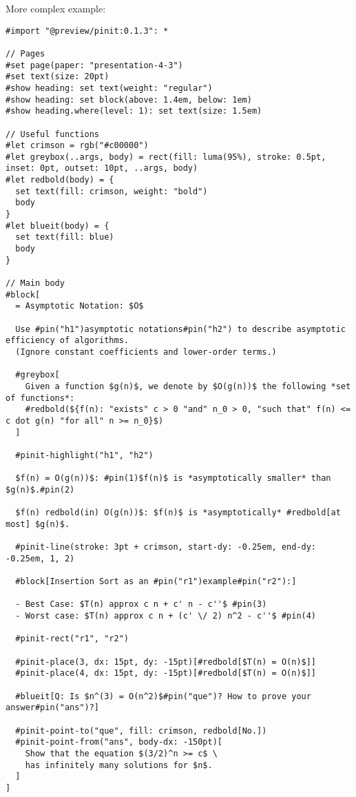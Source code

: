 \pandocbounded{}

More complex example:

\begin{verbatim}
#import "@preview/pinit:0.1.3": *

// Pages
#set page(paper: "presentation-4-3")
#set text(size: 20pt)
#show heading: set text(weight: "regular")
#show heading: set block(above: 1.4em, below: 1em)
#show heading.where(level: 1): set text(size: 1.5em)

// Useful functions
#let crimson = rgb("#c00000")
#let greybox(..args, body) = rect(fill: luma(95%), stroke: 0.5pt, inset: 0pt, outset: 10pt, ..args, body)
#let redbold(body) = {
  set text(fill: crimson, weight: "bold")
  body
}
#let blueit(body) = {
  set text(fill: blue)
  body
}

// Main body
#block[
  = Asymptotic Notation: $O$

  Use #pin("h1")asymptotic notations#pin("h2") to describe asymptotic efficiency of algorithms.
  (Ignore constant coefficients and lower-order terms.)

  #greybox[
    Given a function $g(n)$, we denote by $O(g(n))$ the following *set of functions*:
    #redbold(${f(n): "exists" c > 0 "and" n_0 > 0, "such that" f(n) <= c dot g(n) "for all" n >= n_0}$)
  ]

  #pinit-highlight("h1", "h2")

  $f(n) = O(g(n))$: #pin(1)$f(n)$ is *asymptotically smaller* than $g(n)$.#pin(2)

  $f(n) redbold(in) O(g(n))$: $f(n)$ is *asymptotically* #redbold[at most] $g(n)$.

  #pinit-line(stroke: 3pt + crimson, start-dy: -0.25em, end-dy: -0.25em, 1, 2)

  #block[Insertion Sort as an #pin("r1")example#pin("r2"):]

  - Best Case: $T(n) approx c n + c' n - c''$ #pin(3)
  - Worst case: $T(n) approx c n + (c' \/ 2) n^2 - c''$ #pin(4)

  #pinit-rect("r1", "r2")

  #pinit-place(3, dx: 15pt, dy: -15pt)[#redbold[$T(n) = O(n)$]]
  #pinit-place(4, dx: 15pt, dy: -15pt)[#redbold[$T(n) = O(n)$]]

  #blueit[Q: Is $n^(3) = O(n^2)$#pin("que")? How to prove your answer#pin("ans")?]

  #pinit-point-to("que", fill: crimson, redbold[No.])
  #pinit-point-from("ans", body-dx: -150pt)[
    Show that the equation $(3/2)^n >= c$ \
    has infinitely many solutions for $n$.
  ]
]
\end{verbatim}


